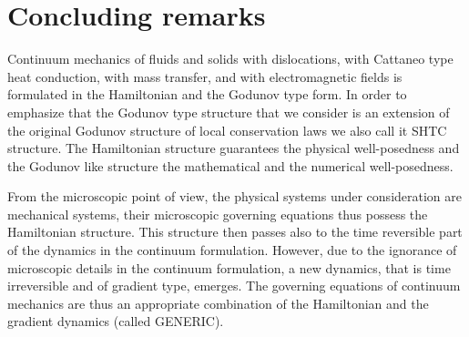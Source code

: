 \documentclass[twoside]{article}
\begin{document}
\begin{comment}
\subsection{Electrodynamics of moving media}
Write model, give reference to the paper \cite{DPRZ2017}

\subsection{Surface tension}
if will be ready

\subsection{Colloids}
if Sasha will finish his work, and include him into co-authors maybe

\subsection{Extension to the general relativistic framework}
say that the work is in progress. Once we have finished, we can add the model 
here
\end{comment}






\section{Concluding remarks}


Continuum mechanics of fluids and solids with dislocations, with Cattaneo type 
heat conduction, with mass transfer, and with electromagnetic fields is 
formulated in the 
Hamiltonian and the Godunov type 
form. In order to emphasize that the Godunov type structure that we consider is 
an extension of the original Godunov structure of local conservation laws we 
also call it SHTC structure.
The Hamiltonian structure guarantees the physical well-posedness and the 
Godunov like structure the mathematical and the numerical well-posedness.


From the microscopic  point of view, the physical systems under consideration 
are  mechanical systems, their microscopic governing equations thus possess the 
Hamiltonian structure. This structure then passes also to the time reversible 
part of the dynamics in the continuum formulation. However,
due to the ignorance of microscopic details in the continuum  formulation,  a 
new dynamics, that is time irreversible and of gradient type, emerges. The 
governing equations of continuum mechanics are thus an appropriate combination 
of the Hamiltonian and the gradient dynamics (called GENERIC).
\end{document}
